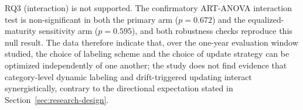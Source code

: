 RQ3 (interaction) is not supported. The confirmatory ART-ANOVA interaction test is non-significant in both the primary arm ($p=0.672$) and the equalized-maturity sensitivity arm ($p=0.595$), and both robustness checks reproduce this null result. The data therefore indicate that, over the one-year evaluation window studied, the choice of labeling scheme and the choice of update strategy can be optimized independently of one another; the study does not find evidence that category-level dynamic labeling and drift-triggered updating interact synergistically, contrary to the directional expectation stated in Section~\ref{sec:research-design}.
